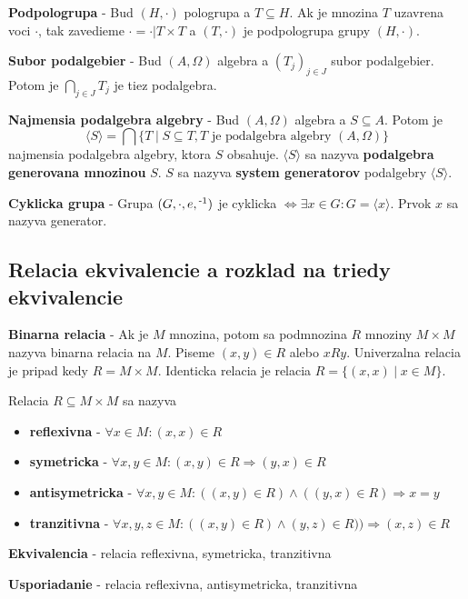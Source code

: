 \documentclass[12pt]{article}
\newcommand{\pipesep}{\hspace{3pt} \vert \hspace{3pt}}
\begin{document}
\textbf{Podpologrupa} - Bud $(H,\cdot)$ pologrupa a $T \subseteq H$. Ak je mnozina $T$ uzavrena voci $\cdot$,
tak zavedieme $\cdot = \cdot|T\times T$ a $(T,\cdot)$ je podpologrupa grupy $(H,\cdot)$.

\textbf{Subor podalgebier} - Bud $(A, \Omega)$ algebra a $(T_{j})_{j \in J}$ subor podalgebier. Potom je
$\bigcap_{j \in J} T_{j}$ je tiez podalgebra.

\textbf{Najmensia podalgebra algebry} - Bud $(A, \Omega)$ algebra a $S \subseteq A$. Potom je
\begin{equation*}
	\langle S \rangle = \bigcap\{T \pipesep S \subseteq T, T\text{ je podalgebra algebry }(A, \Omega)\}
\end{equation*}
najmensia podalgebra algebry, ktora $S$ obsahuje. $\langle S \rangle$ sa nazyva \textbf{podalgebra generovana mnozinou}
$S$. $S$ sa nazyva \textbf{system generatorov} podalgebry $\langle S \rangle$.

\textbf{Cyklicka grupa} - Grupa $(G,\cdot,e,\textsuperscript{-1})$ je cyklicka $\Leftrightarrow \exists x \in G: G = \langle x \rangle$.
Prvok $x$ sa nazyva generator.

\subsection{Relacia ekvivalencie a rozklad na triedy ekvivalencie}
\textbf{Binarna relacia} - Ak je $M$ mnozina, potom sa podmnozina $R$ mnoziny $M \times M$ nazyva
binarna relacia na $M$. Piseme $(x,y) \in R$ alebo $xRy$. Univerzalna relacia je pripad kedy
$R = M \times M$. Identicka relacia je relacia $R = \{(x,x) \pipesep x \in M\}$.

Relacia $R \subseteq M \times M$ sa nazyva
\begin{itemize}
	\item \textbf{reflexivna} - $\forall x \in M: (x,x) \in R$
	\item \textbf{symetricka} - $\forall x,y \in M: (x,y) \in R \Rightarrow (y,x) \in R$
	\item \textbf{antisymetricka} - $\forall x,y \in M: ((x,y) \in R) \land ((y,x) \in R) \Rightarrow x = y$
	\item \textbf{tranzitivna} - $\forall x,y,z \in M: ((x,y) \in R) \land (y,z) \in R)) \Rightarrow (x,z) \in R$
\end{itemize}

\textbf{Ekvivalencia} - relacia reflexivna, symetricka, tranzitivna

\textbf{Usporiadanie} - relacia reflexivna, antisymetricka, tranzitivna
\end{document}
